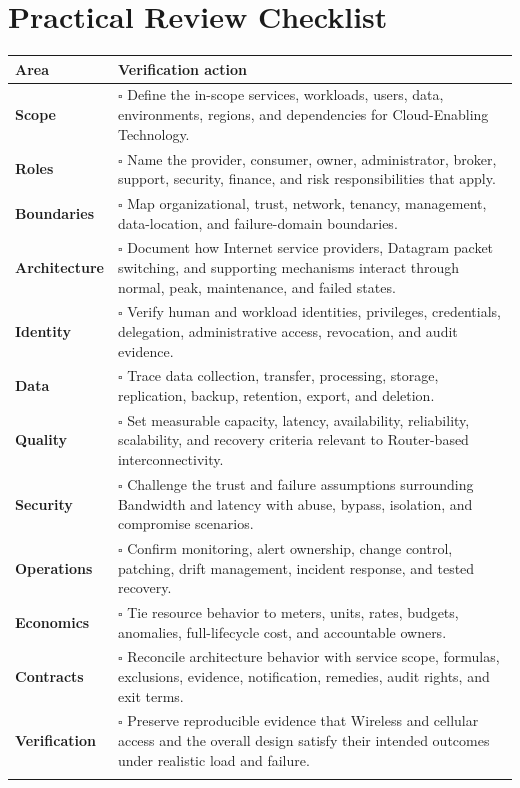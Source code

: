\documentclass[11pt]{article}
\begin{document}
\section{Practical Review Checklist}
\begin{longtable}{@{}>{\bfseries\color{Teal}}p{}>{\RaggedRight\arraybackslash}p{}@{}}
\toprule\textbf{Area} & \textbf{Verification action}\\\midrule\endhead
Scope & $\square$ Define the in-scope services, workloads, users, data, environments, regions, and dependencies for Cloud-Enabling Technology. \\\addlinespace[2pt]
Roles & $\square$ Name the provider, consumer, owner, administrator, broker, support, security, finance, and risk responsibilities that apply. \\\addlinespace[2pt]
Boundaries & $\square$ Map organizational, trust, network, tenancy, management, data-location, and failure-domain boundaries. \\\addlinespace[2pt]
Architecture & $\square$ Document how Internet service providers, Datagram packet switching, and supporting mechanisms interact through normal, peak, maintenance, and failed states. \\\addlinespace[2pt]
Identity & $\square$ Verify human and workload identities, privileges, credentials, delegation, administrative access, revocation, and audit evidence. \\\addlinespace[2pt]
Data & $\square$ Trace data collection, transfer, processing, storage, replication, backup, retention, export, and deletion. \\\addlinespace[2pt]
Quality & $\square$ Set measurable capacity, latency, availability, reliability, scalability, and recovery criteria relevant to Router-based interconnectivity. \\\addlinespace[2pt]
Security & $\square$ Challenge the trust and failure assumptions surrounding Bandwidth and latency with abuse, bypass, isolation, and compromise scenarios. \\\addlinespace[2pt]
Operations & $\square$ Confirm monitoring, alert ownership, change control, patching, drift management, incident response, and tested recovery. \\\addlinespace[2pt]
Economics & $\square$ Tie resource behavior to meters, units, rates, budgets, anomalies, full-lifecycle cost, and accountable owners. \\\addlinespace[2pt]
Contracts & $\square$ Reconcile architecture behavior with service scope, formulas, exclusions, evidence, notification, remedies, audit rights, and exit terms. \\\addlinespace[2pt]
Verification & $\square$ Preserve reproducible evidence that Wireless and cellular access and the overall design satisfy their intended outcomes under realistic load and failure. \\\addlinespace[2pt]
\bottomrule
\end{longtable}
\end{document}
